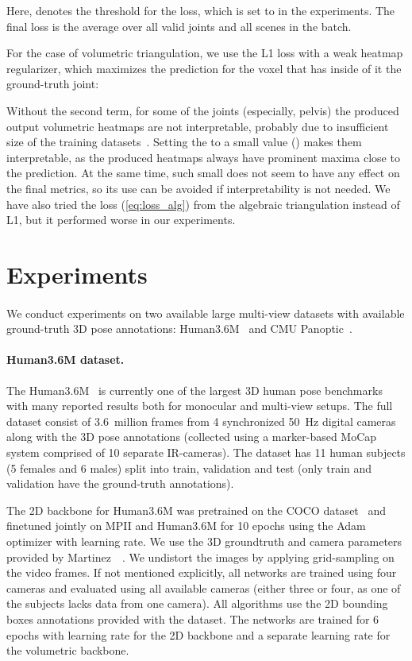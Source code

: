 \documentclass[10pt,twocolumn,letterpaper]{article}
\newcommand{\eq}[1]{(\ref{eq:#1})}
\begin{document}
Here,  denotes the threshold for the loss, which is set to  in the experiments. The final loss is the average over all valid joints and all scenes in the batch.

For the case of volumetric triangulation, we use the L1 loss with a weak heatmap regularizer, which maximizes the prediction for the voxel that has inside of it the ground-truth joint:

 Without the second term, for some of the joints (especially, pelvis) the produced output volumetric heatmaps are not interpretable, probably due to insufficient size of the training datasets~\cite{sun2018integral}. Setting the  to a small value () makes them interpretable, as the produced heatmaps always have prominent maxima close to the prediction. At the same time, such small  does not seem to have any effect on  the final metrics, so its use can be avoided if interpretability is not needed. We have also tried the loss \eq{loss_alg} from the algebraic triangulation instead of L1, but it performed worse in our experiments.

 \section{Experiments}

\paragraph{}
We conduct experiments on two available large multi-view datasets with available ground-truth 3D pose annotations: Human3.6M~\cite{h36m_pami} and CMU Panoptic~\cite{Joo_2017_TPAMI,xiang2018monocular,Simon_2017_CVPR}. 

\paragraph{Human3.6M dataset.} The Human3.6M~\cite{h36m_pami} is currently one of the largest 3D human pose benchmarks with many reported results both for monocular and multi-view setups. The full dataset consist of 3.6~million frames from 4 synchronized 50~Hz digital cameras along with the 3D pose annotations (collected using a marker-based MoCap system comprised of 10 separate IR-cameras). The dataset has 11 human subjects (5 females and 6 males) split into train, validation and test (only train and validation have the ground-truth annotations). 

The 2D backbone for Human3.6M was pretrained on the COCO dataset~\cite{lin2014microsoft} and finetuned jointly on MPII and Human3.6M for 10 epochs using the Adam optimizer with  learning rate. We use the 3D groundtruth and camera parameters provided by Martinez~\etal~\cite{martinez2017simple}. We undistort the images by applying grid-sampling on the video frames. If not mentioned explicitly, all networks are trained using four cameras and evaluated using all available cameras (either three or four, as one of the subjects lacks data from one camera). All algorithms use the 2D bounding boxes annotations provided with the dataset. The networks are trained for 6 epochs with  learning rate for the 2D backbone and a separate learning rate  for the volumetric backbone. 
\end{document}
